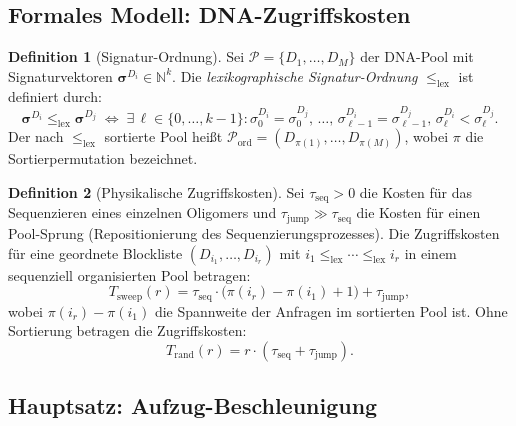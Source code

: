 ﻿\documentclass[a4paper,12pt]{article}
\theoremstyle{definition}
\newtheorem{definition}{Definition}[section]
\theoremstyle{plain}
\begin{document}
\subsection{Formales Modell: DNA-Zugriffskosten}
\label{ssec:elevator_modell}

\begin{definition}[Signatur-Ordnung]
\label{def:sig_ordnung}
  Sei $\mathcal{P} = \{D_1, \ldots, D_M\}$ der DNA-Pool mit
  Signaturvektoren $\boldsymbol{\sigma}^{D_i} \in \mathbb{N}^k$.
  Die \emph{lexikographische Signatur-Ordnung} $\le_{\mathrm{lex}}$ ist
  definiert durch:
  \[
    \boldsymbol{\sigma}^{D_i} \le_{\mathrm{lex}} \boldsymbol{\sigma}^{D_j}
    \;\Longleftrightarrow\;
    \exists\, \ell \in \{0, \ldots, k-1\}:
    \sigma_0^{D_i} = \sigma_0^{D_j},\, \ldots,\,
    \sigma_{\ell-1}^{D_i} = \sigma_{\ell-1}^{D_j},\,
    \sigma_\ell^{D_i} < \sigma_\ell^{D_j}.
  \]
  Der nach $\le_{\mathrm{lex}}$ sortierte Pool heißt
  $\mathcal{P}_{\mathrm{ord}} = (D_{\pi(1)}, \ldots, D_{\pi(M)})$,
  wobei $\pi$ die Sortierpermutation bezeichnet.
\end{definition}

\begin{definition}[Physikalische Zugriffskosten]
\label{def:zugriffskosten}
  Sei $\tau_{\mathrm{seq}} > 0$ die Kosten für das Sequenzieren eines
  einzelnen Oligomers und $\tau_{\mathrm{jump}} \gg \tau_{\mathrm{seq}}$
  die Kosten für einen Pool-Sprung (Repositionierung des
  Sequenzierungsprozesses).  Die Zugriffskosten für eine geordnete
  Blockliste $(D_{i_1}, \ldots, D_{i_r})$ mit
  $i_1 \le_{\mathrm{lex}} \cdots \le_{\mathrm{lex}} i_r$
  in einem sequenziell organisierten Pool betragen:
  \[
    T_{\mathrm{sweep}}(r)
    = \tau_{\mathrm{seq}} \cdot \bigl(\pi(i_r) - \pi(i_1) + 1\bigr)
      + \tau_{\mathrm{jump}},
  \]
  wobei $\pi(i_r) - \pi(i_1)$ die Spannweite der Anfragen im
  sortierten Pool ist.  Ohne Sortierung betragen die Zugriffskosten:
  \[
    T_{\mathrm{rand}}(r) = r \cdot (\tau_{\mathrm{seq}} + \tau_{\mathrm{jump}}).
  \]
\end{definition}

\subsection{Hauptsatz: Aufzug-Beschleunigung}
\label{ssec:elevator_satz}
\end{document}
